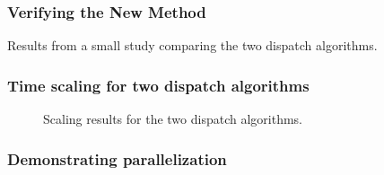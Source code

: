 \begin{frame}
    \frametitle{Verifying the New Method}

    \begin{table}
        \centering
        \caption{Results from a small study comparing the two dispatch
        algorithms. }
        \label{tab:alg-comparison}
        \resizebox{0.8\columnwidth}{!}{}
    \end{table}

\end{frame}


    

\begin{frame}
    \frametitle{Time scaling for two dispatch algorithms}

    \begin{figure}
        \centering
        \resizebox{0.72\columnwidth}{!}{}
        \caption{Scaling results for the two dispatch algorithms.
        }
        \label{fig:time-scaling}
    \end{figure}
    
\end{frame}


\begin{frame}
    \frametitle{Demonstrating parallelization}

    \begin{figure}
        \centering
        \resizebox{0.72\columnwidth}{!}{}
        \caption{}
        \label{fig:parallel}
    \end{figure}
\end{frame}

